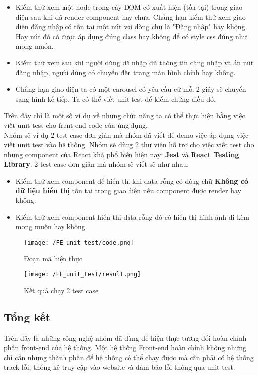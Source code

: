 			 	\begin{itemize}
			 		\item Kiểm thử xem một node trong cây DOM có xuất hiện (tồn tại) trong giao diện sau khi đã render component hay chưa. Chẳng hạn kiểm thử xem giao diện đăng nhập có tồn tại một nút với dòng chữ là "Đăng nhập" hay không. Hay nút đó có được áp dụng đúng class hay không để có style css đúng như mong muốn.
			 		\item Kiểm thử xem sau khi người dùng đã nhập đủ thông tin đăng nhập và ấn nút đăng nhập, người dùng có chuyển đến trang màn hình chính hay không.
			 		\item Chẳng hạn giao diện ta có một carousel có yêu cầu cứ mỗi 2 giây sẽ chuyển sang hình kế tiếp. Ta có thể viết unit test để kiểm chứng điều đó.
			 	\end{itemize}
			 	
			 	Trên đây chỉ là một số ví dụ về những chức năng ta có thể thực hiện bằng việc viết unit test cho front-end code của ứng dụng.\\
			 	
			 	Nhóm sẽ ví dụ 2 test case đơn giản mà nhóm đã viết để demo việc áp dụng việc viết unit test vào hệ thống. Nhóm sẽ dùng 2 thư viện hỗ trợ cho việc viết test cho những component của React khá phổ biến hiện nay: \textbf{Jest} và \textbf{React Testing Library}. 2 test case đơn giản mà nhóm sẽ viết sẽ như nhau:
			 	
			 	\begin{itemize}
			 		\item Kiểm thử xem component để hiển thị khi data rỗng có dòng chữ \textbf{Không có dữ liệu hiển thị} tồn tại trong giao diện nếu component được render hay không.
			 		\item Kiểm thử xem component hiển thị data rỗng đó có hiển thị hình ảnh đi kèm mong muốn hay không.
			 	\end{itemize}
			 	
			 	\begin{figure}[H]
			 		\texttt{[image: /FE\_unit\_test/code.png]}
			 		\centering
			 		\caption{Đoạn mã hiện thực}
			 	\end{figure}
			 	
			 	\begin{figure}[H]
			 		\texttt{[image: /FE\_unit\_test/result.png]}
			 		\centering
			 		\caption{Kết quả chạy 2 test case}
			 	\end{figure}
			 	
			 	\subsection{Tổng kết}
			 	Trên đây là những công nghệ nhóm đã dùng để hiện thực tương đối hoàn chỉnh phần front-end của hệ thống. Một hệ thống Front-end hoàn chỉnh không những chỉ cần những thành phần để hệ thống có thể chạy được mà cần phải có hệ thống track lỗi, thống kê truy cập vào website và đảm bảo lỗi thông qua unit test.
		
	